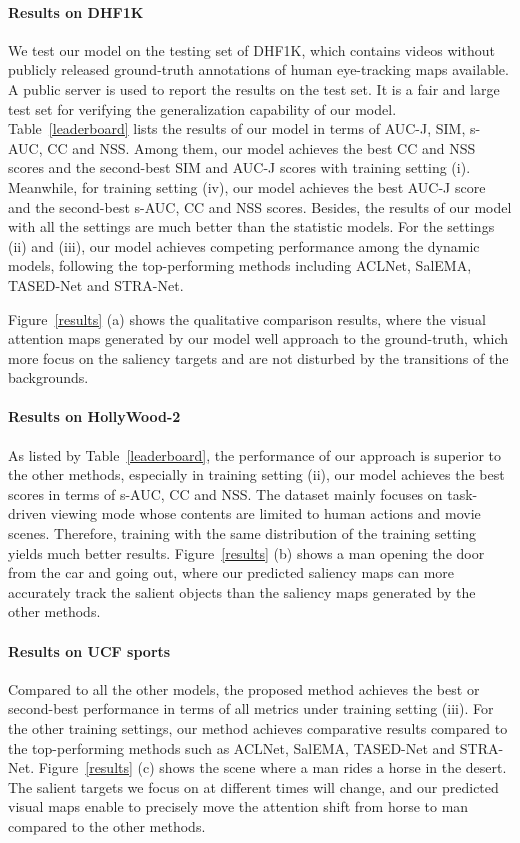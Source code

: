 \documentclass[review]{elsarticle}
\begin{document}
\paragraph{Results on DHF1K} We test our model on the testing set of DHF1K, which contains  videos without publicly released ground-truth annotations of human eye-tracking maps available. A public server is used to report the results on the test set.
It is a fair and large test set for verifying the generalization capability of our model.
Table~\ref{leaderboard} lists the results of our model in terms of AUC-J, SIM, s-AUC, CC and NSS. Among them, our model achieves the best CC and NSS scores and the second-best SIM and AUC-J scores with training setting (i). Meanwhile, for training setting (iv), our model achieves the best AUC-J score and the second-best s-AUC, CC and NSS scores.
Besides, the results of our model with all the settings are much better than the statistic models.
For the settings (ii) and (iii), our model achieves competing performance among the dynamic models, following the top-performing methods including ACLNet, SalEMA, TASED-Net and STRA-Net.


Figure~\ref{results} (a) shows the qualitative comparison results, where the visual attention maps generated by our model well approach to the ground-truth, which more focus on the saliency targets and are not disturbed by the transitions of the backgrounds.

\paragraph{Results on HollyWood-2} As listed by Table~\ref{leaderboard}, the performance of our approach is superior to the other methods,  especially in training setting (ii), our model achieves the best scores in terms of s-AUC, CC and NSS.
The dataset mainly focuses on task-driven viewing mode whose contents are limited to human actions and movie scenes.
Therefore, training with the same distribution of the training setting yields much better results.
Figure~\ref{results} (b) shows a man opening the door from the car and going out, where our predicted saliency maps can more accurately track the salient objects than the saliency maps generated by the other methods.

\paragraph{Results on UCF sports} Compared to all the other models, the proposed method achieves the best or second-best performance in terms of all metrics under training setting (iii). For the other training settings, our method achieves comparative results compared to the top-performing methods such as ACLNet, SalEMA, TASED-Net and STRA-Net.
Figure~\ref{results} (c) shows the scene where a man rides a horse in the desert.
The salient targets we focus on at different times will change, and our predicted visual maps enable to precisely move the attention shift from horse to man compared to the other methods.
\end{document}
